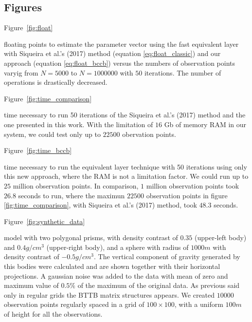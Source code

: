 \documentclass[paper]{geophysics}
\begin{document}
\newpage



\subsection*{Figures}
\renewcommand{\figdir}{Fig} %

Figure~\ref{fig:float}

{floating points to estimate the parameter vector using the fast equivalent layer with Siqueira et al.'s (2017) method (equation \ref{eq:float_classic}) and our approach (equation \ref{eq:float_bccb}) versus the numbers of observation points varyig from $N = 5000$ to $N = 1000000$ with $50$ iterations. The number of operations is drastically decreased.}
\newpage

Figure~\ref{fig:time_comparison}

{time necessary to run 50 iterations of the Siqueira et al.'s (2017) method and the one presented in this work. With the limitation of $16$ Gb of memory RAM in our system, we could test only up to $22500$ obervation points.}

Figure~\ref{fig:time_bccb}

{time necessary to run the equivalent layer technique with 50 iterations using only this new approach, where the RAM is not a limitation factor. We could run up to $25$ million observation points. In comparison, $1$ million observation points took $26.8$ seconds to run, where the maximun $22500$ observation points in figure \ref{fig:time_comparison}, with Siqueira et al.'s (2017) method, took $48.3$ seconds.}
\newpage

Figure~\ref{fig:synthetic_data}

{model with two polygonal prisms, with density contrast of $0.35$ (upper-left body) and $0.4 g/cm^3$ (upper-right body), and a sphere with radius of $1000 m$ with density contrast of $-0.5 g/cm^3$. The vertical component of gravity generated by this bodies were calculated and are shown together with their horizontal projections. A gaussian noise was added to the data with mean of zero and maximum value of $0.5\%$ of the maximum of the original data. As previous said only in regular grids the BTTB matrix structures appears. We created $10000$ observation points regularly spaced in a grid of $100 \times 100$, with a uniform $100 m$ of height for all the observations.}
\newpage
\end{document}
